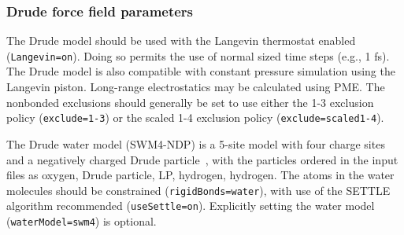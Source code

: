 \subsubsection{Drude force field parameters}

The Drude model should be used with the Langevin thermostat enabled
  ({\tt Langevin=on}).
Doing so permits the use of normal sized time steps (e.g., 1 fs).
The Drude model is also compatible with constant pressure simulation using the
  Langevin piston.
Long-range electrostatics may be calculated using PME.
The nonbonded exclusions should generally be set to use either the 1-3
  exclusion policy ({\tt exclude=1-3}) or the scaled 1-4 exclusion policy
  ({\tt exclude=scaled1-4}).

The Drude water model (SWM4-NDP) is a 5-site model with four charge sites and
  a negatively charged Drude particle~\cite{Lamoureux-2006a}, with the
  particles ordered in the input files as oxygen, Drude particle, LP, hydrogen,
  hydrogen.
The atoms in the water molecules should be constrained
  ({\tt rigidBonds=water}), with use of the SETTLE algorithm recommended
  ({\tt useSettle=on}).
Explicitly setting the water model ({\tt waterModel=swm4}) is optional.

